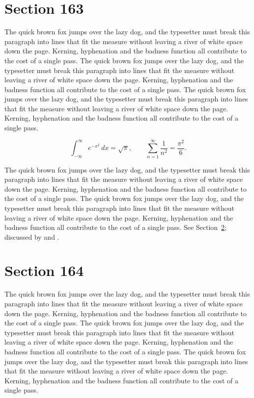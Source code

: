 \documentclass{article}
\begin{document}
\section{Section 163}
\label{sec:163}
The quick brown fox jumps over the lazy dog, and the typesetter must break this paragraph into lines that fit the measure without leaving a river of white space down the page. Kerning, hyphenation and the badness function all contribute to the cost of a single pass. The quick brown fox jumps over the lazy dog, and the typesetter must break this paragraph into lines that fit the measure without leaving a river of white space down the page. Kerning, hyphenation and the badness function all contribute to the cost of a single pass. The quick brown fox jumps over the lazy dog, and the typesetter must break this paragraph into lines that fit the measure without leaving a river of white space down the page. Kerning, hyphenation and the badness function all contribute to the cost of a single pass. 

\begin{equation}\label{eq:163}
\int_{-\infty}^{\infty} e^{-x^{2}}\,dx = \sqrt{\pi}, \qquad
\sum_{n=1}^{\infty} \frac{1}{n^{2}} = \frac{\pi^{2}}{6}.
\end{equation}

The quick brown fox jumps over the lazy dog, and the typesetter must break this paragraph into lines that fit the measure without leaving a river of white space down the page. Kerning, hyphenation and the badness function all contribute to the cost of a single pass. The quick brown fox jumps over the lazy dog, and the typesetter must break this paragraph into lines that fit the measure without leaving a river of white space down the page. Kerning, hyphenation and the badness function all contribute to the cost of a single pass. 
See Section~\ref{sec:164}; discussed by \textcite{k4} and \textcite{l1}.
\section{Section 164}
\label{sec:164}
The quick brown fox jumps over the lazy dog, and the typesetter must break this paragraph into lines that fit the measure without leaving a river of white space down the page. Kerning, hyphenation and the badness function all contribute to the cost of a single pass. The quick brown fox jumps over the lazy dog, and the typesetter must break this paragraph into lines that fit the measure without leaving a river of white space down the page. Kerning, hyphenation and the badness function all contribute to the cost of a single pass. The quick brown fox jumps over the lazy dog, and the typesetter must break this paragraph into lines that fit the measure without leaving a river of white space down the page. Kerning, hyphenation and the badness function all contribute to the cost of a single pass. 
\end{document}
